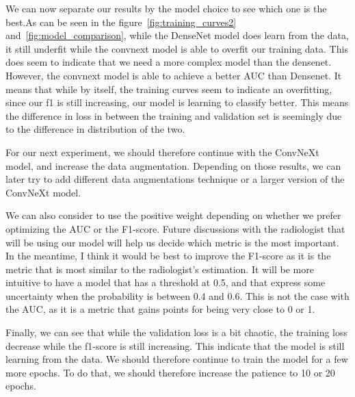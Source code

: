 \documentclass[11pt]{article}
\begin{document}
                We can now separate our results by the model choice to see which one is the best.As can be seen in
                the figure~\ref{fig:training_curves2} and~\ref{fig:model_comparison}, while the DenseNet model does
                learn from the data, it still underfit while the convnext model is able to overfit our training data.
                This does seem to indicate that we need a more complex model than the densenet.
                However, the convnext model is able to achieve a better AUC than Densenet. It means that while by itself, the training curves seem
                to indicate an overfitting, since our f1 is still increasing, our model is learning to classify better. This means the difference in loss in between the training
                and validation set is seemingly due to the difference in distribution of the two.

                For our next experiment, we should therefore continue with the ConvNeXt model, and increase the data
                augmentation. Depending on those results, we can later try to add different data augmentations
                technique or a larger version of the ConvNeXt model.

                We can also consider to use the positive weight depending on whether we prefer optimizing the AUC or the F1-score. Future discussions with the radiologist
                that will be using our model will help us decide which metric is the most important. In the meantime, I think it would be best to improve the F1-score as
                it is the metric that is most similar to the radiologist's estimation. It will be more intuitive to have a model that has a threshold at 0.5, and that express
                some uncertainty when the probability is between 0.4 and 0.6. This is not the case with the AUC, as it is a metric that gains points for being very close to 0 or 1.

                Finally, we can see that while the validation loss is a bit chaotic, the training loss decrease while the f1-score is still increasing. This indicate
                that the model is still learning from the data. We should therefore continue to train the model for a few more epochs. To do that, we should therefore increase the patience
                to 10 or 20 epochs.
\end{document}
